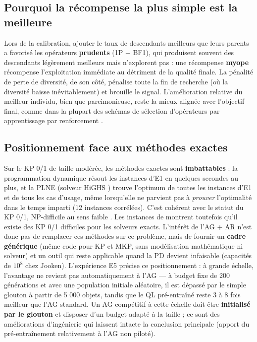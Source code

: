 \documentclass[
  french,
  11pt,
  a4paper,
]{article}
\begin{document}
\subsection{Pourquoi la récompense la plus simple est la
meilleure}\label{discussion-pourquoi-la-ruxe9compense-la-plus-simple-est-la-meilleure}

Lors de la calibration, ajouter le taux de descendants meilleurs que
leurs parents a favorisé les opérateurs \textbf{prudents} (1P + BF1),
qui produisent souvent des descendants légèrement meilleurs mais
n'explorent pas : une récompense \textbf{myope} récompense
l'exploitation immédiate au détriment de la qualité finale. La pénalité
de perte de diversité, de son côté, pénalise toute la fin de recherche
(où la diversité baisse inévitablement) et brouille le signal.
L'amélioration relative du meilleur individu, bien que parcimonieuse,
reste la mieux alignée avec l'objectif final, comme dans la plupart des
schémas de sélection d'opérateurs par apprentissage par renforcement
\autocite{karimi-mamaghan_machine_2022,talbi_2021}.

\subsection{Positionnement face aux méthodes
exactes}\label{discussion-positionnement-face-aux-muxe9thodes-exactes}

Sur le KP 0/1 de taille modérée, les méthodes exactes sont
\textbf{imbattables} : la programmation dynamique
\autocite{bellman_1957,kellerer_improved_2004} résout les instances d'E1
en quelques secondes au plus, et la PLNE (solveur HiGHS
\autocite{huangfu_hall_2018}) trouve l'optimum de toutes les instances
d'E1 et de tous les cas d'usage, même lorsqu'elle ne parvient pas à
\emph{prouver} l'optimalité dans le temps imparti (12 instances
corrélées). C'est cohérent avec le statut du KP 0/1, NP-difficile au
sens faible
\autocite{garey_johnson_1979,pisinger_where_2005,cacchiani_knapsack_2022-1}.
Les instances de \textcite{jooken_2022} montrent toutefois qu'il existe
des KP 0/1 difficiles pour les solveurs exacts. L'intérêt de l'AG + AR
n'est donc pas de remplacer ces méthodes sur ce problème, mais de
fournir un \textbf{cadre générique} (même code pour KP et MKP, sans
modélisation mathématique ni solveur) et un outil qui reste applicable
quand la PD devient infaisable (capacités de \(10^8\) chez Jooken).
L'expérience E5 précise ce positionnement : à grande échelle, l'avantage
ne revient pas automatiquement à l'AG --- à budget fixe de 200
générations et avec une population initiale aléatoire, il est dépassé
par le simple glouton à partir de 5 000 objets, tandis que le QL
pré-entraîné reste 3 à 8 fois meilleur que l'AG standard. Un AG
compétitif à cette échelle doit être \textbf{initialisé par le glouton}
et disposer d'un budget adapté à la taille ; ce sont des améliorations
d'ingénierie qui laissent intacte la conclusion principale (apport du
pré-entraînement relativement à l'AG non piloté).
\end{document}
